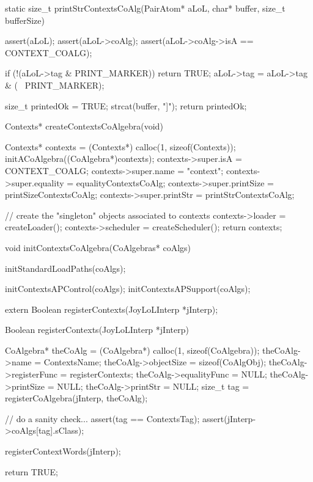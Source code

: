 static size_t printStrContextsCoAlg(PairAtom* aLoL,
                                   char* buffer, size_t bufferSize) {
  assert(aLoL);
  assert(aLoL->coAlg);
  assert(aLoL->coAlg->isA == CONTEXT_COALG);

  if (!(aLoL->tag & PRINT_MARKER)) return TRUE;
  aLoL->tag = aLoL->tag & (~ PRINT_MARKER);

  size_t printedOk = TRUE;
  strcat(buffer, "\n[");
  strcat(buffer, aLoL->context->name);
  strcat(buffer, "[ ");
  lolPrintStr(printedOk, aLoL->context->data,
              "d:( ", ") ", buffer, bufferSize);
  lolPrintStr(printedOk, aLoL->context->command,
              "c:( ", ") ", buffer, bufferSize);
  lolPrintStr(printedOk, aLoL->context->process,
              "p:( ", ") ", buffer, bufferSize);
  lolPrintStr(printedOk, aLoL->context->messages,
              "m:( ", ") ", buffer, bufferSize);
  lolPrintStr(printedOk, aLoL->context->listeners,
              "l:( ", ") ", buffer, bufferSize);
  strcat(buffer, " ]]\n");
  return printedOk;
}

Contexts* createContextsCoAlgebra(void) {
  Contexts* contexts  = (Contexts*) calloc(1, sizeof(Contexts));
  initACoAlgebra((CoAlgebra*)contexts);
  contexts->super.isA       = CONTEXT_COALG;
  contexts->super.name      = "context";
  contexts->super.equality  = equalityContextsCoAlg;
  contexts->super.printSize = printSizeContextsCoAlg;
  contexts->super.printStr  = printStrContextsCoAlg;

  // create the "singleton" objects associated to contexts
  contexts->loader          = createLoader();
  contexts->scheduler       = createScheduler();
  return contexts;
}

void initContextsCoAlgebra(CoAlgebras* coAlgs) {
  initStandardLoadPaths(coAlgs);

  initContextsAPControl(coAlgs);
  initContextsAPSupport(coAlgs);
}
\stoptyping

\startTestSuite[registerContexts]

\startCHeader
extern Boolean registerContexts(JoyLoLInterp *jInterp);
\stopCHeader
{}

\startCCode
Boolean registerContexts(JoyLoLInterp *jInterp) {
  CoAlgebra* theCoAlg    = (CoAlgebra*) calloc(1, sizeof(CoAlgebra));
  theCoAlg->name         = ContextsName;
  theCoAlg->objectSize   = sizeof(CoAlgObj);
  theCoAlg->registerFunc = registerContexts;
  theCoAlg->equalityFunc = NULL;
  theCoAlg->printSize    = NULL;
  theCoAlg->printStr     = NULL;
  size_t tag = registerCoAlgebra(jInterp, theCoAlg);

  // do a sanity check...
  assert(tag == ContextsTag);
  assert(jInterp->coAlgs[tag].sClass);
  
  registerContextWords(jInterp);
  
  return TRUE;
}
\stopCCode

